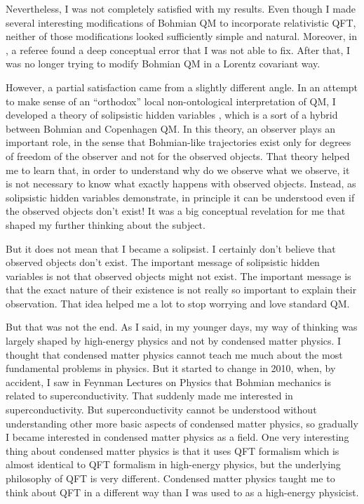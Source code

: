 \documentclass[12pt]{article}
\begin{document}
Nevertheless, I was not completely satisfied with my results. Even though I made several interesting modifications 
of Bohmian QM to incorporate relativistic QFT, neither of those modifications looked sufficiently simple and natural. 
Moreover, in \cite{nik2013}, a referee found a 
deep conceptual error that I was not able to fix. After that, I was no longer trying to modify Bohmian QM in 
a Lorentz covariant way.

However, a partial satisfaction came from a slightly different angle. In an attempt to make sense of 
an ``orthodox'' local 
non-ontological interpretation of QM, I developed a theory of solipsistic hidden variables \cite{niksolip},
which is a sort of a hybrid 
between Bohmian and Copenhagen QM. In this theory, an observer plays an important role, in the sense that 
Bohmian-like trajectories exist only for degrees of freedom of the observer and not for the observed objects. 
That theory helped me to learn that, in order to understand why do we observe what we observe, 
it is not necessary to know what exactly happens with observed objects. Instead, as solipsistic hidden variables demonstrate, 
in principle it can be understood even if the observed objects don't exist! It was a big conceptual revelation for me that 
shaped my further thinking about the subject.

But it does not mean that I became a solipsist. I certainly don't believe that observed objects don't exist. 
The important message of solipsistic hidden variables
is not that observed objects might not exist. The important message is that the exact nature of 
their existence is not really so important to explain their observation. That idea helped me a lot to stop worrying and 
love standard QM.

But that was not the end. As I said, in my younger days, my way of thinking was largely shaped by high-energy 
physics and not by condensed matter physics. I thought that condensed matter physics cannot teach me much about 
the most fundamental problems in physics. But it started to change in 2010, when, by accident, 
I saw in Feynman Lectures on Physics \cite{feyn3} that Bohmian mechanics is related to superconductivity. 
That suddenly made me interested in superconductivity. But superconductivity cannot be understood without understanding 
other more basic aspects of condensed matter physics, so gradually I became interested in condensed matter physics as a field. 
One very interesting thing about condensed matter physics is that it uses QFT formalism which is almost identical to QFT formalism 
in high-energy physics, but the underlying philosophy of QFT is very different. 
Condensed matter physics taught me to think about QFT in a different way than I was used to as a high-energy physicist.
\end{document}
